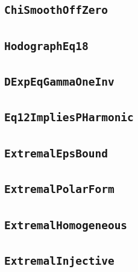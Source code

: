 \documentclass[11pt]{amsart}
\theoremstyle{definition}
\begin{document}
\subsection{\texorpdfstring{\texttt{ChiSmoothOffZero}}{ChiSmoothOffZero}}\label{node:ChiSmoothOffZero}


\subsection{\texorpdfstring{\texttt{HodographEq18}}{HodographEq18}}\label{node:HodographEq18}


\subsection{\texorpdfstring{\texttt{DExpEqGammaOneInv}}{DExpEqGammaOneInv}}\label{node:DExpEqGammaOneInv}


\subsection{\texorpdfstring{\texttt{Eq12ImpliesPHarmonic}}{Eq12ImpliesPHarmonic}}\label{node:Eq12ImpliesPHarmonic}


\subsection{\texorpdfstring{\texttt{ExtremalEpsBound}}{ExtremalEpsBound}}\label{node:ExtremalEpsBound}


\subsection{\texorpdfstring{\texttt{ExtremalPolarForm}}{ExtremalPolarForm}}\label{node:ExtremalPolarForm}


\subsection{\texorpdfstring{\texttt{ExtremalHomogeneous}}{ExtremalHomogeneous}}\label{node:ExtremalHomogeneous}


\subsection{\texorpdfstring{\texttt{ExtremalInjective}}{ExtremalInjective}}\label{node:ExtremalInjective}

\end{document}
